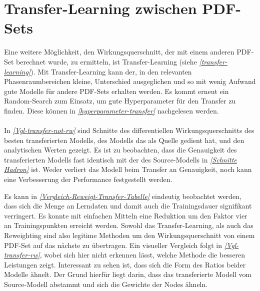 \section{Transfer-Learning zwischen PDF-Sets}
Eine weitere Möglichkeit, den Wirkungsquerschnitt, der mit einem anderen PDF-Set berechnet wurde, zu ermitteln, ist Transfer-Learning (siehe \textit{\autoref{transfer-learning}}). Mit Transfer-Learning kann der, in den relevanten Phasenraumbereichen kleine, Unterschied ausgeglichen und so mit wenig Aufwand gute Modelle für andere PDF-Sets erhalten werden. Es kommt erneut ein Random-Search zum Einsatz, um gute Hyperparameter für den Transfer zu finden. Diese können in \textit{\autoref{hyperparameter-transfer}} nachgelesen werden.\\
\\
In \textit{\autoref{Vgl-transfer-not-rw}} sind Schnitte des differentiellen Wirkungsquerschnitts des besten transferierten Modells, des Modells das als Quelle gedient hat, und den analytischen Werten gezeigt. Es ist zu beobachten, dass die Genauigkeit des transferierten Modells fast identisch mit der des Source-Modells in \textit{\autoref{Schnitte Hadron}} ist. Weder verliert das Modell beim Transfer an Genauigkeit, noch kann eine Verbesserung der Performance festgestellt werden.

Es kann in \textit{\autoref{Vergleich-Reweigt-Transfer-Tabelle}} eindeutig beobachtet werden, dass sich die Menge an Lerndaten und damit auch die Trainingsdauer signifikant verringert. Es konnte mit einfachen Mitteln eine Reduktion um den Faktor vier an Trainingspunkten erreicht werden. Sowohl das Transfer-Learning, als auch das Reweighting sind also legitime Methoden um den Wirkungsquerschnitt von einem PDF-Set auf das nächste zu übertragen. Ein visueller Vergleich folgt in \textit{\autoref{Vgl-transfer-rw}}, wobei sich hier nicht erkennen lässt, welche Methode die besseren Leistungen zeigt. Interessant zu sehen ist, dass sich die Form des Ratios beider Modelle ähnelt. Der Grund hierfür liegt darin, dass das transferierte Modell vom Source-Modell abstammt und sich die Gewichte der Nodes ähneln.

